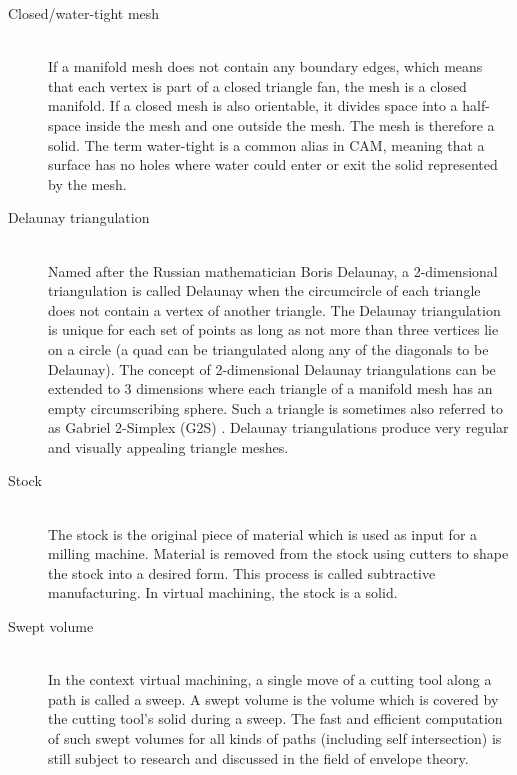 \begin{description}
	
	\item[Closed/water-tight mesh] \hfill \\
	If a manifold mesh does not contain any boundary edges, which means that each vertex is part of a closed triangle fan, the mesh is a closed manifold.
	If a closed mesh is also orientable, it divides space into a half-space inside the mesh and one outside the mesh.
	The mesh is therefore a solid.
	The term water-tight is a common alias in CAM, meaning that a surface has no holes where water could enter or exit the solid represented by the mesh.
	
	
	
	
	\item[Delaunay triangulation] \hfill \\
	Named after the Russian mathematician Boris Delaunay, a 2-dimensional triangulation is called Delaunay when the circumcircle of each triangle does not contain a vertex of another triangle.
	The Delaunay triangulation is unique for each set of points as long as not more than three vertices lie on a circle (\eg a quad can be triangulated along any of the diagonals to be Delaunay).
	The concept of 2-dimensional Delaunay triangulations can be extended to 3 dimensions where each triangle of a manifold mesh has an empty circumscribing sphere.
	Such a triangle is sometimes also referred to as Gabriel 2-Simplex (G2S) \cite{g2s}.
	Delaunay triangulations produce very regular and visually appealing triangle meshes.
	
	
	\item[Stock] \hfill \\
	The stock is the original piece of material which is used as input for a milling machine.
	Material is removed from the stock using cutters to shape the stock into a desired form.
	This process is called subtractive manufacturing.
	In virtual machining, the stock is a solid.
	
	
	\item[Swept volume] \hfill \\
	In the context virtual machining, a single move of a cutting tool along a path is called a sweep.
	A swept volume is the volume which is covered by the cutting tool's solid during a sweep.
	The fast and efficient computation of such swept volumes for all kinds of paths (including self intersection) is still subject to research and discussed in the field of envelope theory.
	
\end{description}

